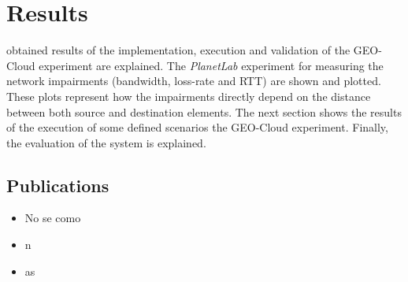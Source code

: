 \chapter{Results}
\label{chap:results}

 obtained results of the implementation, execution and
validation of the GEO-Cloud experiment are explained. The \emph{PlanetLab}
experiment for measuring the network impairments (bandwidth, loss-rate and
\ac{RTT}) are shown and plotted. These plots represent how the impairments
directly depend on the distance between both source and destination elements.
The next section shows the results of the execution of some defined scenarios
the GEO-Cloud experiment. Finally, the evaluation of the system is explained.





\section{Publications}

\begin{itemize}

\item No se como 
\item n
\item as
\end{itemize}
